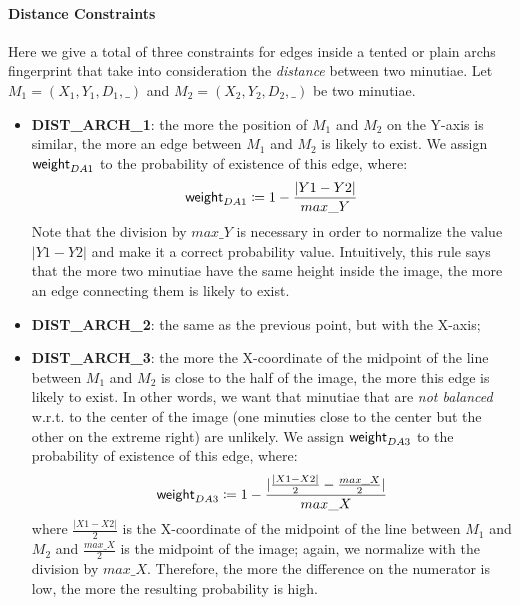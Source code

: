 \documentclass[8pt]{article}
\begin{document}
\paragraph{Distance Constraints}
Here we give a total of three constraints for edges inside
a tented or plain archs fingerprint that take into consideration the
\emph{distance} between two minutiae.
Let $M_1=(X_1,Y_1,D_1,\_)$ and $M_2=(X_2,Y_2,D_2,\_)$ be two minutiae.
  \begin{itemize}
    \item \textbf{DIST\_ARCH\_1}: the more the position of $M_1$ and $M_2$
          on the Y-axis is similar, the more an edge between $M_1$ and $M_2$
          is likely to exist. We assign $\textsf{weight}_{DA1}$ to the probability
          of existence of this edge, where:
            \begin{align*}
              \textsf{weight}_{DA1} \coloneqq 1-\frac{\lvert Y1-Y2\rvert}{max\_Y}
            \end{align*}
          Note that the division by $max\_Y$ is necessary in order to
          normalize the value $\lvert Y1-Y2\rvert$ and make it a correct
          probability value. Intuitively, this rule says that the more two
          minutiae have the same height inside the image, the more an edge
          connecting them is likely to exist.
    \item \textbf{DIST\_ARCH\_2}: the same as the previous point, but with
          the X-axis;
    \item \textbf{DIST\_ARCH\_3}: the more the X-coordinate of the midpoint of 
          the line between $M_1$ and $M_2$ is close to the half of the image,
          the more this edge is likely to exist. In other words, we want that
          minutiae that are \emph{not balanced} w.r.t. to the center of the
          image (\eg one minuties close to the center but the other on the 
          extreme right) are unlikely. We assign $\textsf{weight}_{DA3}$ to the 
          probability of existence of this edge, where:
            \begin{align*}
              \textsf{weight}_{DA3} \coloneqq 1 -
              \frac{\lvert \frac{\lvert X1-X2 \rvert}{2} - \frac{max\_X}{2}
              \rvert}{max\_X}
            \end{align*}
          where $\frac{\lvert X1-X2 \rvert}{2}$ is the X-coordinate of the
          midpoint of the line between $M_1$ and $M_2$ and $\frac{max\_X}{2}$
          is the midpoint of the image; again, we normalize with the division
          by $max\_X$. Therefore, the more the difference on the numerator is
          low, the more the resulting probability is high.
  \end{itemize}
\end{document}
